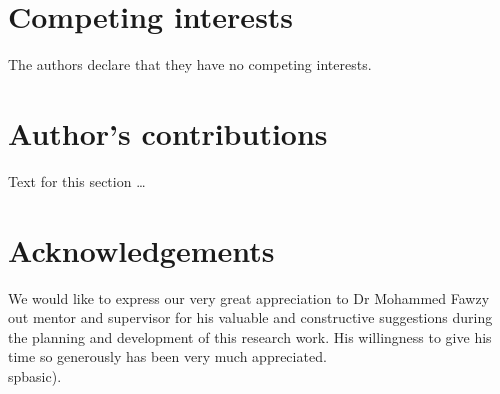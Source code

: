\documentclass{bmcart}
\begin{document}
\begin{backmatter}

\section*{Competing interests}
  The authors declare that they have no competing interests.

\section*{Author's contributions}
    Text for this section \ldots

\section*{Acknowledgements}
We would like to express our very great appreciation to Dr Mohammed Fawzy out
mentor and supervisor for his valuable and constructive suggestions during the planning and development of
this research work. His willingness to give his time so generously has been very
much appreciated.\\

spbasic).       %



\end{backmatter}
\end{document}
